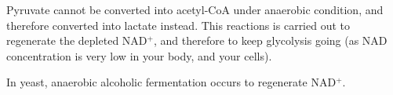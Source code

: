 Pyruvate cannot be converted into acetyl-CoA under anaerobic condition, and therefore converted into lactate instead.
This reactions is carried out to regenerate the depleted NAD$^+$, and therefore to keep glycolysis going (as NAD concentration is very low in your body, and your cells).

\begin{center}
\end{center}

\begin{center}
\end{center}

In yeast, anaerobic alcoholic fermentation occurs to regenerate NAD$^+$.

